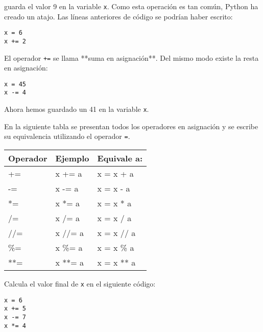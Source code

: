 \documentclass[a4paper, 11pt]{scrartcl}
\newenvironment{code}{\begin{tcolorbox}[colback=red!2!white]}{\end{tcolorbox}}
\begin{document}
guarda el valor 9 en la variable \verb|x|. Como esta operación es tan común, Python ha creado un atajo. Las líneas anteriores de código se podrían haber escrito:

\smallskip

\begin{code}

\begin{verbatim}
x = 6
x += 2
\end{verbatim}

\end{code}

El operador \verb|+=| se llama **suma en asignación**. Del mismo modo existe la resta en asignación:

\smallskip

\begin{code}

\begin{verbatim}
x = 45
x -= 4
\end{verbatim}

\end{code}

Ahora hemos guardado un 41 en la variable \verb|x|.

En la siguiente tabla se presentan todos los operadores en asignación y se escribe su equivalencia utilizando el operador \verb|=|.

\begin{center}
\begin{tabular}{|l|l|l|}
\hline
Operador & Ejemplo & Equivale a: \\ \hline
+=       & x += a  & x = x + a   \\ \hline
-=       & x -= a  & x = x - a   \\ \hline
*=       & x *= a  & x = x * a   \\ \hline
/=       & x /= a  & x = x / a   \\ \hline
//=      & x //= a & x = x // a  \\ \hline
\%=      & x \%= a & x = x \% a  \\ \hline
**=      & x **= a & x = x ** a  \\ \hline
\end{tabular}
\end{center}


Calcula el valor final de \verb|x| en el siguiente código:

\smallskip

\begin{code}

\begin{verbatim}
x = 6
x += 5
x -= 7
x *= 4
\end{verbatim}

\end{code}
\end{document}
